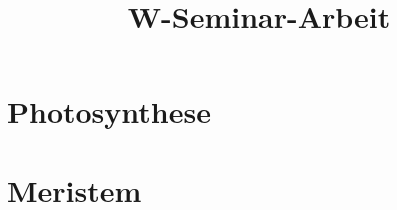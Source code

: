 \documentclass[a4paper, 11pt, ngerman]{scrreprt}
\title{W-Seminar-Arbeit}
\begin{document}
\tableofcontents

\chapter{Photosynthese}

\chapter{Meristem}
\end{document}
